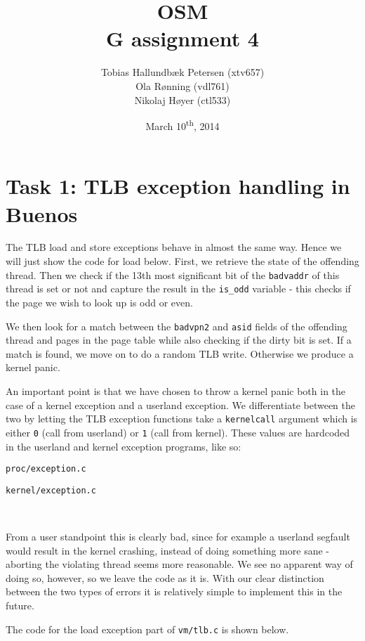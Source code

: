 \documentclass[a4paper,12pt]{article}
\title{OSM\\G assignment 4}
\author{Tobias Hallundbæk Petersen (xtv657)\\Ola Rønning (vdl761)\\Nikolaj Høyer (ctl533)}
\date{March 10\textsuperscript{th}, 2014}
\begin{document}
\maketitle
\tableofcontents
\newpage

\section{Task 1: TLB exception handling in Buenos}
The TLB load and store exceptions behave in almost the same way. Hence we will just show the code for load below. First, we retrieve the state of the offending thread. Then we check if the 13th most significant bit of the \texttt{badvaddr} of this thread is set or not and capture the result in the \texttt{is\_odd} variable - this checks if the page we wish to look up is odd or even.

We then look for a match between the \texttt{badvpn2} and \texttt{asid} fields of the offending thread and pages in the page table while also checking if the dirty bit is set. If a match is found, we move on to do a random TLB write. Otherwise we produce a kernel panic.

An important point is that we have chosen to throw a kernel panic both in the case of a kernel exception and a userland exception. We differentiate between the two by letting the TLB exception functions take a \texttt{kernelcall} argument which is either \texttt{0} (call from userland) or \texttt{1} (call from kernel). These values are hardcoded in the userland and kernel exception programs, like so:


\texttt{proc/exception.c}


\texttt{kernel/exception.c}

\

From a user standpoint this is clearly bad, since for example a userland segfault would result in the kernel crashing, instead of doing something more sane - aborting the violating thread seems more reasonable. We see no apparent way of doing so, however, so we leave the code as it is. With our clear distinction between the two types of errors it is relatively simple to implement this in the future.
 
The code for the load exception part of \texttt{vm/tlb.c} is shown below.

\end{document}
